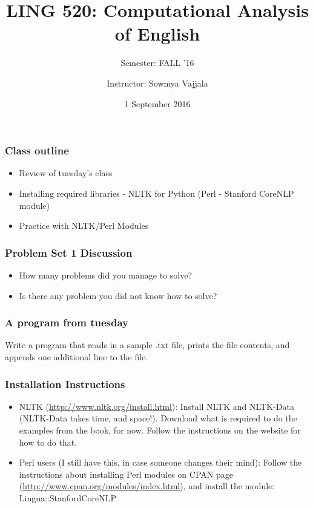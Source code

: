 \documentclass{beamer}
\author[Sowmya Vajjala]{Instructor: Sowmya Vajjala}
\title[LING 520]{LING 520: Computational Analysis of English}
\subtitle{Semester: FALL '16}
\date{1 September 2016}
\institute{Iowa State University, USA}
\begin{document}
\begin{frame}\titlepage
\end{frame}

\begin{frame}
\frametitle{Class outline}
\begin{itemize}
\item Review of tuesday's class
\item Installing required libraries - NLTK for Python (Perl - Stanford CoreNLP module)
\item Practice with NLTK/Perl Modules
\end{itemize}
\end{frame}

\begin{frame}
\frametitle{Problem Set 1 Discussion}
\begin{itemize}
\item How many problems did you manage to solve?
\item Is there any problem you did not know how to solve?
\end{itemize}
\end{frame}

\begin{frame}
\frametitle{A program from tuesday}
Write a program that reads in a sample .txt file, prints the file contents, and appends one additional line to the file. 
\end{frame}


\begin{frame}
\frametitle{Installation Instructions}
\begin{itemize}
\item NLTK (\url{http://www.nltk.org/install.html}): Install NLTK and NLTK-Data (NLTK-Data takes time, and space!). Download what is required to do the examples from the book, for now. Follow the instructions on the website for how to do that.
\item Perl users (I still have this, in case someone changes their mind): Follow the instructions about installing Perl modules on CPAN page (\url{http://www.cpan.org/modules/index.html}), and install the module: Lingua::StanfordCoreNLP
\end{itemize}
\end{frame}
\end{document}
